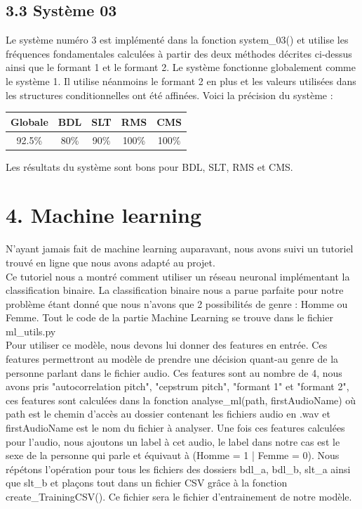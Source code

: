 \documentclass[a4paper,12pt]{report}	%
\begin{document}
{\subsection*{3.3 Système 03}}
Le système numéro 3 est implémenté dans la fonction system\_03() et utilise les fréquences fondamentales calculées à partir des deux méthodes décrites ci-dessus ainsi que le formant 1 et le formant 2. Le système fonctionne globalement comme le système 1. Il utilise néanmoins le formant 2 en plus et les valeurs utilisées dans les structures conditionnelles ont été affinées. Voici la précision du système : \\
\begin{center}
	\begin{tabular}{|c|c|c|c|c|}
		\hline
		Globale & BDL & SLT & RMS & CMS \\
		\hline
		92.5\% & 80\% & 90\% & 100\% & 100\% \\
		\hline
	\end{tabular}
\end{center}
Les résultats du système sont bons pour BDL, SLT, RMS et CMS.
{\section*{4. Machine learning}}
N'ayant jamais fait de machine learning auparavant, nous avons suivi un tutoriel trouvé en ligne que nous avons adapté au projet. \\
Ce tutoriel nous a montré comment utiliser un réseau neuronal implémentant la classification binaire. La classification binaire nous a parue parfaite pour notre problème étant donné que nous n'avons que 2 possibilités de genre : Homme ou Femme. Tout le code de la partie Machine Learning se trouve dans le fichier ml\_utils.py\\
Pour utiliser ce modèle, nous devons lui donner des features en entrée. Ces features permettront au modèle de prendre une décision quant-au genre de la personne parlant dans le fichier audio. Ces features sont au nombre de 4, nous avons pris "autocorrelation pitch", "cepstrum pitch", "formant 1" et "formant 2", ces features sont calculées dans la fonction analyse\_ml(path, firstAudioName) où path est le chemin d'accès au dossier contenant les fichiers audio en .wav et firstAudioName est le nom du fichier à analyser. Une fois ces features calculées pour l'audio, nous ajoutons un label à cet audio, le label dans notre cas est le sexe de la personne qui parle et équivaut à (Homme = 1 | Femme = 0). Nous répétons l'opération pour tous les fichiers des dossiers bdl\_a, bdl\_b, slt\_a ainsi que slt\_b et plaçons tout dans un fichier CSV grâce à la fonction create\_TrainingCSV(). Ce fichier sera le fichier d'entrainement de notre modèle.
\end{document}
